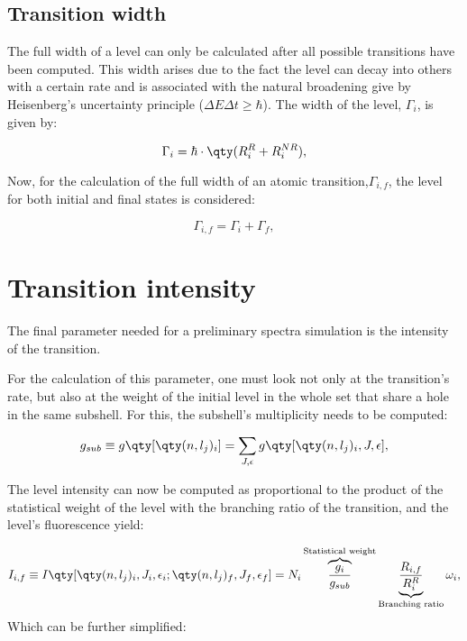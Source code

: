 \subsection{Transition width}

The full width of a level can only be calculated after all possible transitions have been computed. This width arises due to the fact the level can decay into others with a certain rate and is associated with the natural broadening give by Heisenberg's uncertainty principle ($\Delta E \Delta t\geq \hbar$). The width of the level, $\Gamma_i$, is given by:

\begin{equation}
    \Gamma_i = \hbar\cdot \qty(R_i^{R}+R_i^{NR}),
\end{equation}

Now, for the calculation of the full width of an atomic transition,$\Gamma_{i,f}$, the level for both initial and final states is considered:

\begin{equation}
    \Gamma_{i,f}=\Gamma_i+\Gamma_f,
    \label{eq:trans_width}
\end{equation}

\section{Transition intensity}\label{sec:trans_int}

The final parameter needed for a preliminary spectra simulation is the intensity of the transition.

For the calculation of this parameter, one must look not only at the transition's rate, but also at the weight of the  initial level in the whole set that share a hole in the same subshell. For this, the subshell's multiplicity needs to be computed:

\begin{equation}
    g_{sub}\equiv g\qty[\qty(n,l_j)_i]=\sum_{J,\epsilon}g\qty[\qty(n,l_j)_i,J,\epsilon],
\end{equation}

The level intensity can now be computed as proportional to the product of the statistical weight of the level with the branching ratio of the transition, and the level's fluorescence yield:

\begin{equation}
    I_{i,f}\equiv I\qty[\qty(n,l_j)_i,J_i,\epsilon_i;\qty(n,l_j)_f,J_f,\epsilon_f]=N_i \overbrace{\frac{g_i}{g_{sub}}}^{\text{Statistical weight}} \underbrace{\frac{R_{i,f}}{R^R_i}}_{\text{Branching ratio}}  \omega_i, \label{eq:int_1}
\end{equation}
 Which can be further simplified:

